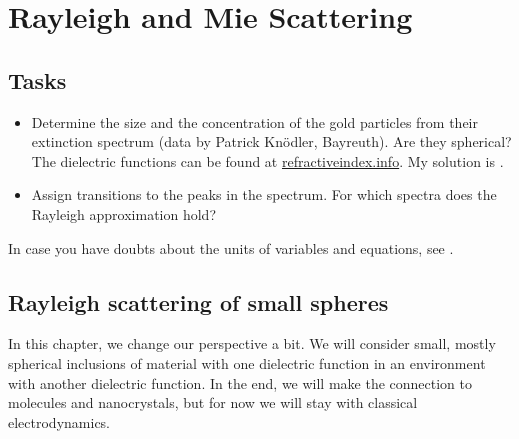 \renewcommand{\lastmod}{April 26, 2024}
\renewcommand{\chapterauthors}{Markus Lippitz}


\chapter{Rayleigh and Mie Scattering}

\label{chap:rayleigh_and_mie}



\section{Tasks}

\begin{itemize}
\item Determine the size and the concentration of the gold particles from their extinction spectrum (data by Patrick Knödler, Bayreuth). Are they spherical? %
The dielectric functions can be found at \href{https://refractiveindex.info/}{refractiveindex.info}. My solution is .

\item Assign transitions to the peaks in the spectrum. For which spectra does the Rayleigh approximation hold?


\end{itemize}

In case you have doubts about the units of variables and equations, see .



\section{Rayleigh scattering of small spheres}


In this chapter, we change our perspective a bit. We will consider small, mostly spherical inclusions of material with one dielectric function in an environment with another dielectric function. In the end, we will make the connection to molecules and nanocrystals, but for now we will stay with classical electrodynamics.

